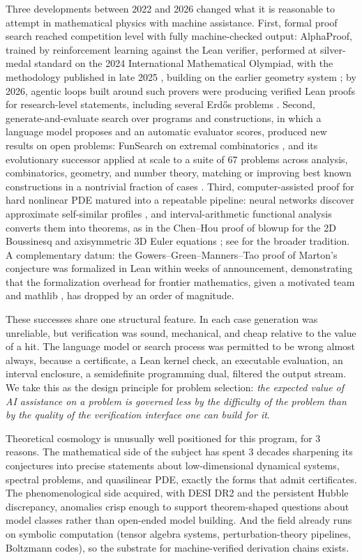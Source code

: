\documentclass[11pt,letterpaper]{article}
\begin{document}
Three developments between 2022 and 2026 changed what it is reasonable to attempt in mathematical physics with machine assistance. First, formal proof search reached competition level with fully machine-checked output: AlphaProof, trained by reinforcement learning against the Lean verifier, performed at silver-medal standard on the 2024 International Mathematical Olympiad, with the methodology published in late 2025 \cite{hubert2025}, building on the earlier geometry system \cite{trinh2024}; by 2026, agentic loops built around such provers were producing verified Lean proofs for research-level statements, including several Erd\H{o}s problems \cite{nexus2026}. Second, generate-and-evaluate search over programs and constructions, in which a language model proposes and an automatic evaluator scores, produced new results on open problems: FunSearch on extremal combinatorics \cite{romera2024}, and its evolutionary successor applied at scale to a suite of 67 problems across analysis, combinatorics, geometry, and number theory, matching or improving best known constructions in a nontrivial fraction of cases \cite{georgiev2025}. Third, computer-assisted proof for hard nonlinear PDE matured into a repeatable pipeline: neural networks discover approximate self-similar profiles \cite{wang2023}, and interval-arithmetic functional analysis converts them into theorems, as in the Chen--Hou proof of blowup for the 2D Boussinesq and axisymmetric 3D Euler equations \cite{chenhou2022}; see \cite{gomezserrano2019,tucker2002} for the broader tradition. A complementary datum: the Gowers--Green--Manners--Tao proof of Marton's conjecture \cite{gowers2023} was formalized in Lean within weeks of announcement, demonstrating that the formalization overhead for frontier mathematics, given a motivated team and mathlib \cite{mathlib2020}, has dropped by an order of magnitude.

These successes share one structural feature. In each case generation was unreliable, but verification was sound, mechanical, and cheap relative to the value of a hit. The language model or search process was permitted to be wrong almost always, because a certificate, a Lean kernel check, an executable evaluation, an interval enclosure, a semidefinite programming dual, filtered the output stream. We take this as the design principle for problem selection: \emph{the expected value of AI assistance on a problem is governed less by the difficulty of the problem than by the quality of the verification interface one can build for it}.

Theoretical cosmology is unusually well positioned for this program, for 3 reasons. The mathematical side of the subject has spent 3 decades sharpening its conjectures into precise statements about low-dimensional dynamical systems, spectral problems, and quasilinear PDE, exactly the forms that admit certificates. The phenomenological side acquired, with DESI DR2 and the persistent Hubble discrepancy, anomalies crisp enough to support theorem-shaped questions about model classes rather than open-ended model building. And the field already runs on symbolic computation (tensor algebra systems, perturbation-theory pipelines, Boltzmann codes), so the substrate for machine-verified derivation chains exists.
\end{document}
